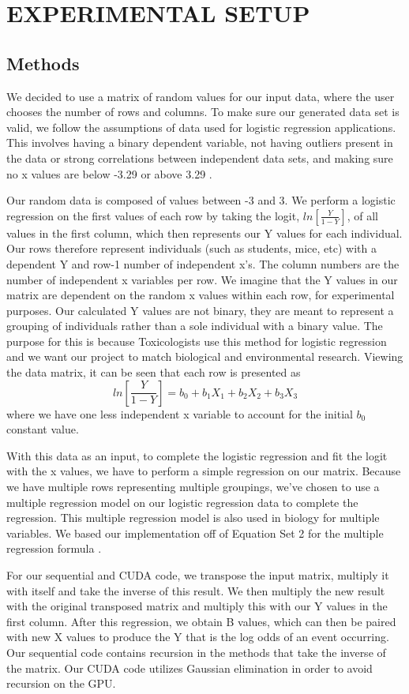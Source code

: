 \documentclass[letterpaper, 10 pt, conference]{ieeeconf}  %
\begin{document}
\section{EXPERIMENTAL SETUP}

\subsection{Methods}
We decided to use a matrix of random values for our input data, where the user chooses the number of rows and columns. To make sure our generated data set is valid, we follow the assumptions of data used for logistic regression applications. This involves having a binary dependent variable, not having outliers present in the data or strong correlations between independent data sets, and making sure no x values are below -3.29 or above 3.29 \cite{c8}.

Our random data is composed of values between -3 and 3. We perform a logistic regression on the first values of each row by taking the logit, $ln[\frac{Y}{1-Y}]$, of all values in the first column, which then represents our Y values for each individual. Our rows therefore represent individuals (such as students, mice, etc) with a dependent Y and row-1 number of independent x’s. The column numbers are the number of independent x variables per row. We imagine that the Y values in our matrix are dependent on the random x values within each row, for experimental purposes. Our calculated Y values are not binary, they are meant to represent a grouping of individuals rather than a sole individual with a binary value. The purpose for this is because Toxicologists use this method for logistic regression and we want our project to match biological and environmental research. Viewing the data matrix, it can be seen that each row is presented as 
$$ln[\frac{Y}{1-Y}] = b_0 + b_1X_1 + b_2X_2 + b_3X_3$$
where we have one less independent x variable to account for the initial $b_0$ constant value. 

With this data as an input, to complete the logistic regression and fit the logit with the x values, we have to perform a simple regression on our matrix. Because we have multiple rows representing multiple groupings, we've chosen to use a multiple regression model on our logistic regression data to complete the regression. This multiple regression model is also used in biology for multiple variables. We based our implementation off of Equation Set 2 for the multiple regression formula \cite{c9}. 

For our sequential and CUDA code, we transpose the input matrix, multiply it with itself and take the inverse of this result. We then multiply the new result with the original transposed matrix and multiply this with our Y values in the first column. After this regression, we obtain B values, which can then be paired with new X values to produce the Y that is the log odds of an event occurring. Our sequential code contains recursion in the methods that take the inverse of the matrix. Our CUDA code utilizes Gaussian elimination in order to avoid recursion on the GPU. 
\end{document}
